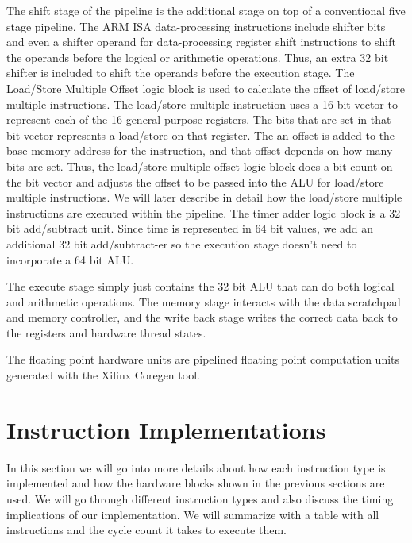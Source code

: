 The shift stage of the pipeline is the additional stage on top of a conventional five stage pipeline. 
The ARM ISA data-processing instructions include shifter bits and even a shifter operand for data-processing register shift instructions to shift the operands before the logical or arithmetic operations.
Thus, an extra 32 bit shifter is included to shift the operands before the execution stage. 
The Load/Store Multiple Offset logic block is used to calculate the offset of load/store multiple instructions.
The load/store multiple instruction uses a 16 bit vector to represent each of the 16 general purpose registers.
The bits that are set in that bit vector represents a load/store on that register.
The an offset is added to the base memory address for the instruction, and that offset depends on how many bits are set. 
Thus, the load/store multiple offset logic block does a bit count on the bit vector and adjusts the offset to be passed into the ALU for load/store multiple instructions.
We will later describe in detail how the load/store multiple instructions are executed within the pipeline.
The timer adder logic block is a 32 bit add/subtract unit. 
Since time is represented in 64 bit values, we add an additional 32 bit add/subtract-er so the execution stage doesn't need to incorporate a 64 bit ALU.

The execute stage simply just contains the 32 bit ALU that can do both logical and arithmetic operations. 
The memory stage interacts with the data scratchpad and memory controller, and the write back stage writes the correct data back to the registers and hardware thread states.

The floating point hardware units are pipelined floating point computation units generated with the Xilinx Coregen tool. 
 
\section{Instruction Implementations}
In this section we will go into more details about how each instruction type is implemented and how the hardware blocks shown in the previous sections are used.
We will go through different instruction types and also discuss the timing implications of our implementation. 
We will summarize with a table with all instructions and the cycle count it takes to execute them.   
